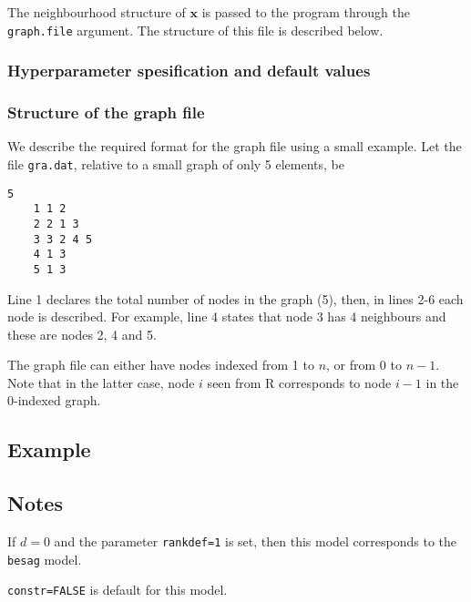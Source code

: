 \documentclass[a4paper,11pt]{article}
\begin{document}
The neighbourhood structure of $\mathbf{x}$ is passed to the program
through the {\tt graph.file} argument.  The structure of this file is
described below.

\subsubsection*{Hyperparameter spesification and default values}



\subsubsection*{Structure of the graph file}

We describe the required format for the graph file using a small
example. Let the file {\tt gra.dat}, relative to a small graph of only
5 elements, be
\begin{lstlisting}[basicstyle=\footnotesize]
    5
    1 1 2
    2 2 1 3
    3 3 2 4 5 
    4 1 3
    5 1 3
\end{lstlisting}
Line 1 declares the total number of nodes in the graph (5), then, in
lines 2-6 each node is described. For example, line 4 states that node
3 has 4 neighbours and these are nodes 2, 4 and 5.

The graph file can either have nodes indexed from 1 to $n$, or from 0
to $n-1$. Note that in the latter case, node $i$ seen from R
corresponds to node $i-1$ in the 0-indexed graph.



\subsection*{Example}



\subsection*{Notes}

If $d=0$ and the parameter \texttt{rankdef=1} is set, then this model
corresponds to the \texttt{besag} model.

\texttt{constr=FALSE} is default for this model.
\end{document}
